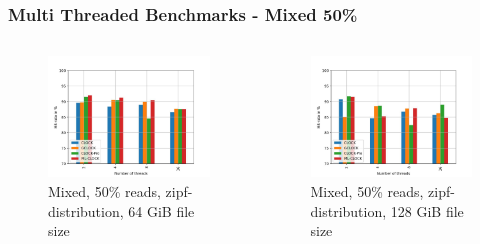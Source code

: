 \documentclass[
	aspectratio=169,
	compress,
]{beamer}
\newcommand{\navframetitle}[1]{\frametitle{#1\hfill{\footnotesize\lastsection{}}}}
\begin{document}
\begin{frame}[fragile]
	\navframetitle{Multi Threaded Benchmarks - Mixed 50\%}

	\begin{columns}
		\begin{column}{0.5\textwidth}
			\begin{figure}[ht]
    			\centering
    			\includegraphics[width=\textwidth]{multi_64_gb_rw_50to50_zipf.jpg}
        		\caption{Mixed, 50\% reads, zipf-distribution, 64 GiB file size}
			\end{figure}
		\end{column}
		\begin{column}{0.5\textwidth}
			\begin{figure}[ht]
    			\centering
    			\includegraphics[width=\textwidth]{multi_128_gb_rw_50to50_zipf.jpg}
        		\caption{Mixed, 50\% reads, zipf-distribution, 128 GiB file size}
			\end{figure}			
		\end{column}
	\end{columns}
\end{frame}
\end{document}
